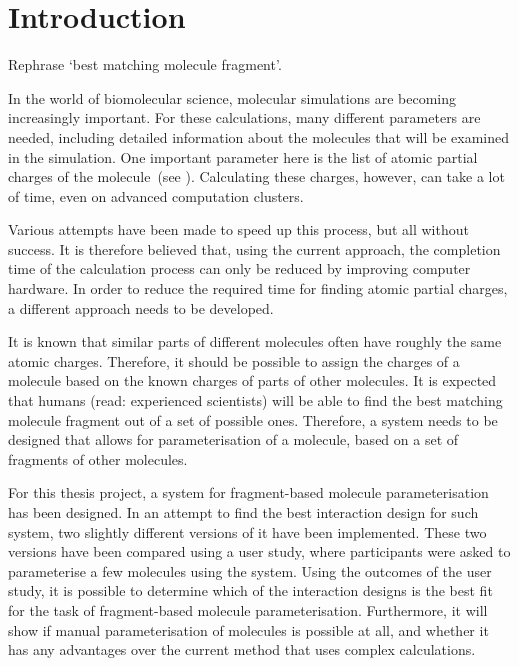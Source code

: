 \chapter{Introduction}

\begin{todo}
\item Rephrase `best matching molecule fragment'.
\end{todo}

In the world of biomolecular science, molecular simulations are becoming increasingly important. For these calculations, many different parameters are needed, including detailed information about the molecules that will be examined in the simulation. One important parameter here is the list of atomic partial charges of the molecule~(see ). Calculating these charges, however, can take a lot of time, even on advanced computation clusters.

Various attempts have been made to speed up this process, but all without success. It is therefore believed that, using the current approach, the completion time of the calculation process can only be reduced by improving computer hardware. In order to reduce the required time for finding atomic partial charges, a different approach needs to be developed.

It is known that similar parts of different molecules often have roughly the same atomic charges. Therefore, it should be possible to assign the charges of a molecule based on the known charges of parts of other molecules. It is expected that humans (read: experienced scientists) will be able to find the best matching molecule fragment out of a set of possible ones. Therefore, a system needs to be designed that allows for parameterisation of a molecule, based on a set of fragments of other molecules.

For this thesis project, a system for fragment-based molecule parameterisation has been designed. In an attempt to find the best interaction design for such system, two slightly different versions of it have been implemented. These two versions have been compared using a user study, where participants were asked to parameterise a few molecules using the system. Using the outcomes of the user study, it is possible to determine which of the interaction designs is the best fit for the task of fragment-based molecule parameterisation. Furthermore, it will show if manual parameterisation of molecules is possible at all, and whether it has any advantages over the current method that uses complex calculations.

